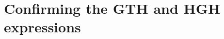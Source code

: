 \documentclass{MFHarticle}
\begin{document}
\section[
Confirming the GTH and HGH expressions
]{Confirming the GTH and HGH expressions \cite{Goedecker1996,Hartwigsen1998}}






\end{document}
